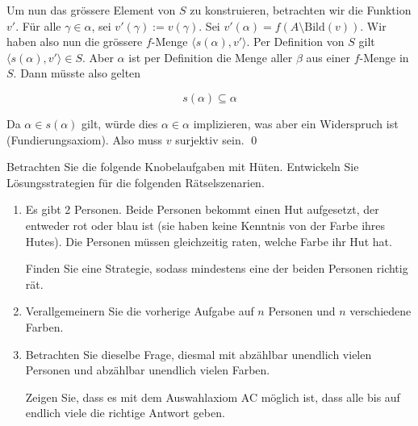 \documentclass[12pt]{article}
\begin{document}
\begin{enumerate}[label=(\alph*)]
    Um nun das grössere Element von $S$ zu konstruieren, betrachten wir die Funktion $v'$. Für alle $\gamma \in \alpha$, sei $v'(\gamma) := v(\gamma)$. Sei $v'(\alpha) = f(A \setminus \mathrm{Bild}(v))$. Wir haben also nun die grössere $f$-Menge $\langle s(\alpha), v' \rangle$. Per Definition von $S$ gilt $\langle s(\alpha), v' \rangle \in S$. Aber $\alpha$ ist per Definition die Menge aller $\beta$ aus einer $f$-Menge in $S$. Dann müsste also gelten 
    
    $$
        s(\alpha) \subseteq \alpha
    $$

    Da $\alpha \in s(\alpha)$ gilt, würde dies $\alpha \in \alpha$ implizieren, was aber ein Widerspruch ist (Fundierungsaxiom). Also muss $v$ surjektiv sein. \qed
\end{enumerate}

\begin{problem}[Aufgabe]{}{}
    Betrachten Sie die folgende Knobelaufgaben mit Hüten. Entwickeln Sie Lösungsstrategien für die folgenden Rätselszenarien.
    \begin{enumerate}[label=(\alph*)]
        \item Es gibt 2 Personen. Beide Personen bekommt einen Hut aufgesetzt, der entweder rot oder blau ist (sie haben keine Kenntnis von der Farbe ihres Hutes). Die Personen müssen gleichzeitig raten, welche Farbe ihr Hut hat.
        
        Finden Sie eine Strategie, sodass mindestens eine der beiden Personen richtig rät.
        
        \item Verallgemeinern Sie die vorherige Aufgabe auf $n$ Personen und $n$ verschiedene Farben.
        
        \item Betrachten Sie dieselbe Frage, diesmal mit abzählbar unendlich vielen Personen und abzählbar unendlich vielen Farben.
        
        Zeigen Sie, dass es mit dem Auswahlaxiom AC möglich ist, dass alle bis auf endlich viele die richtige Antwort geben.
    \end{enumerate}
\end{problem}
\end{document}
